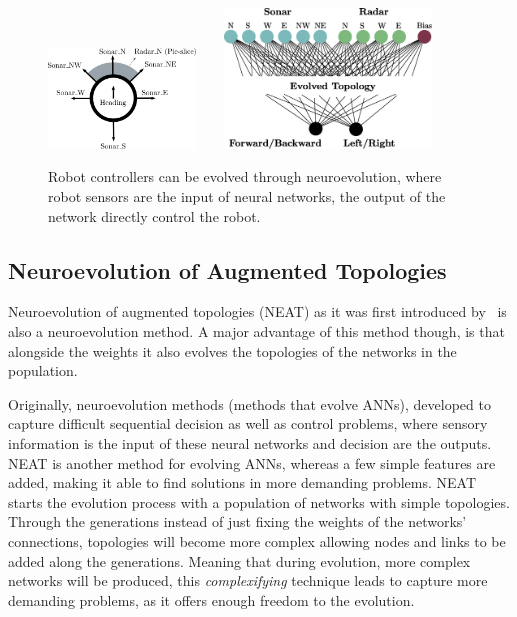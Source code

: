 \begin{figure}[t!]
\centering
\includegraphics[width=0.35\textwidth]{../Figures/Misc/RobotMaze.eps}\  \    \  \    
\includegraphics[width=0.49\textwidth]{../Figures/Misc/RobotMazeNetwork.eps}
\caption{Robot controllers can be evolved through neuroevolution, where robot sensors are the input of neural networks, the output of the network directly control the robot.}
\label{fig:robotExample}
\end{figure}


\subsection{Neuroevolution of Augmented Topologies}

Neuroevolution of augmented topologies (NEAT) as it was first introduced by~\citep{stanley2002evolving} is also a neuroevolution method. A major advantage of this method though, is that alongside the weights it also evolves the topologies of the networks in the population.

Originally, neuroevolution methods (methods that evolve ANNs), developed to capture difficult sequential decision as well as control problems, where sensory information is the input of these neural networks and decision are the outputs. NEAT is another method for evolving ANNs, whereas a few simple features are added, making it able to find solutions in more demanding problems. NEAT starts the evolution process with a population of networks with simple topologies. Through the generations instead of just fixing the weights of the networks' connections, topologies will become more complex allowing nodes and links to be added along the generations. Meaning that during evolution, more complex networks will be produced, this \emph{complexifying} technique leads to capture more demanding problems, as it offers enough freedom to the evolution.

